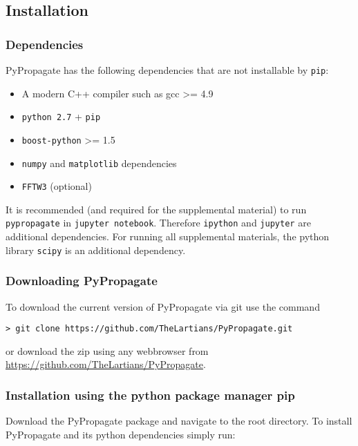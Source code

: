 

\subsection{Installation}

\subsubsection{Dependencies}

PyPropagate has the following dependencies that are not installable by \lstinline{pip}:

\begin{itemize}
    \item A modern C++ compiler such as gcc \textgreater= 4.9
    \item \lstinline{python 2.7} + \lstinline{pip}
    \item \lstinline{boost-python} \textgreater= 1.5
    \item \lstinline{numpy} and \lstinline{matplotlib} dependencies
    \item \lstinline{FFTW3} (optional)
\end{itemize}

It is recommended (and required for the supplemental material) to run \lstinline{pypropagate} in \lstinline{jupyter notebook}. Therefore \lstinline{ipython} and \lstinline{jupyter} are additional dependencies. For running all supplemental materials, the python library \lstinline{scipy} is an additional dependency.

\subsubsection{Downloading PyPropagate}

To download the current version of PyPropagate via git use the command

\begin{lstlisting}
> git clone https://github.com/TheLartians/PyPropagate.git
\end{lstlisting}

or download the zip using any webbrowser from \url{https://github.com/TheLartians/PyPropagate}.

\subsubsection{Installation using the python package manager pip}

Download the PyPropagate package and navigate to the root directory. To install PyPropagate and its python dependencies simply run:

